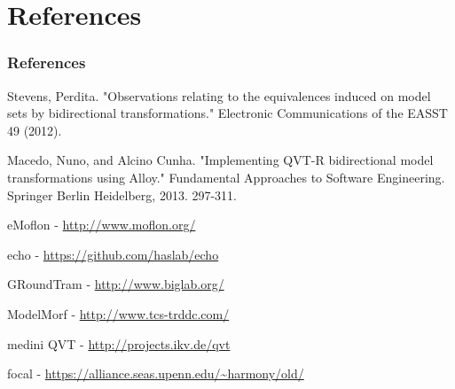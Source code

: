\documentclass{beamer}
\begin{document}
\section{References}
\begin{frame}

\frametitle{References}


\begin{scriptsize}

\begin{thebibliography}{99} %

Stevens, Perdita. "Observations relating to the equivalences induced on model sets by bidirectional transformations." Electronic Communications of the EASST 49 (2012).

 Macedo, Nuno, and Alcino Cunha. "Implementing QVT-R bidirectional model transformations using Alloy." Fundamental Approaches to Software Engineering. Springer Berlin Heidelberg, 2013. 297-311.


 eMoflon - \url{http://www.moflon.org/}

 echo - \url{https://github.com/haslab/echo}

 GRoundTram - \url{http://www.biglab.org/}

 ModelMorf - \url{http://www.tcs-trddc.com/}

 medini QVT - \url{http://projects.ikv.de/qvt}

 focal - \url{https://alliance.seas.upenn.edu/~harmony/old/}

\end{thebibliography}
\end{scriptsize}


\end{frame}





\end{document}
